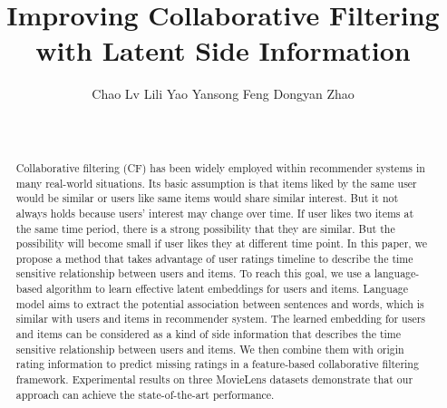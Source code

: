 \documentclass{sig-alternate-05-2015}
\begin{document}

\title{Improving Collaborative Filtering with Latent Side Information}

\author{
\alignauthor
Chao Lv \quad
Lili Yao \quad
Yansong Feng \quad
Dongyan Zhao\\
\\
\\
}

\maketitle

\begin{abstract}
Collaborative filtering (CF) has been widely employed within recommender systems in many real-world situations.
Its basic assumption is that items liked by the same user would be similar or users like same items would share similar interest.
But it not always holds because users' interest may change over time.
If user likes two items at the same time period, there is a strong possibility that they are similar.
But the possibility will become small if user likes they at different time point.
In this paper, we propose a method that takes advantage of user ratings timeline to describe the time sensitive relationship between users and items.
To reach this goal, we use a language-based algorithm to learn effective latent embeddings for users and items.
Language model aims to extract the potential association between sentences and words, which is similar with users and items in recommender system.
The learned embedding for users and items can be considered as a kind of side information that describes the time sensitive relationship between users and items.
We then combine them with origin rating information to predict missing ratings in a feature-based collaborative filtering framework.
Experimental results on three MovieLens datasets demonstrate that our approach can achieve the state-of-the-art performance.
\end{abstract}

\end{document}
